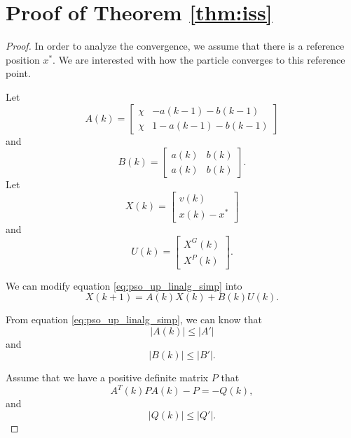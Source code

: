 \section{Proof of Theorem \ref{thm:iss}}
\label{sec:app:proof_iss_thm}

\begin{proof}

In order to analyze the convergence, we assume that there is a reference position $ x^{*} $.
We are interested with how the particle converges to this reference point.

Let
\begin{equation}
\label{eq:def_mat_A}
A(k) = \begin{bmatrix}
\chi & - a(k-1) - b(k-1)
\\ 
\chi & 1 - a(k-1) - b(k-1)
\end{bmatrix}
\end{equation}
and
\begin{equation}
B(k) = 
\begin{bmatrix}
a(k) & b(k)
\\ 
a(k) & b(k)
\end{bmatrix}.
\end{equation}
Let
\begin{equation}
\label{eq:def_mat_x}
X(k) = 
\begin{bmatrix}
v(k)
\\ 
x(k) - x^{*}
\end{bmatrix}
\end{equation}
and
\begin{equation}
U(k) = 
\begin{bmatrix}
X^{G}(k)
\\ 
X^{P}(k)
\end{bmatrix}.
\end{equation}

We can modify equation \eqref{eq:pso_up_linalg_simp} into
\begin{equation}
\label{eq:proof_func}
X(k+1) = A(k) X(k) + B(k) U(k).
\end{equation}

From equation \eqref{eq:pso_up_linalg_simp}, we can know that
\begin{equation}
\label{eq:A_bound}
| A(k) | \leq | A' |
\end{equation}
and
\begin{equation}
\label{eq:B_bound}
| B(k) | \leq | B' |.
\end{equation}

Assume that we have a positive definite matrix $ P $ that
\begin{equation}
\label{eq:stein_equation}
A^{T}(k) P A(k) - P = - Q(k),
\end{equation}
and
\begin{equation}
\label{eq:Q_bound}
| Q(k) | \leq | Q' |.
\end{equation}


\end{proof}
